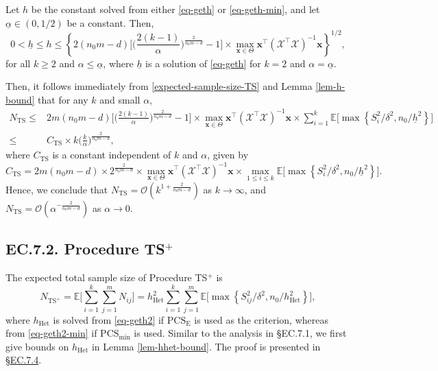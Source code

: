 \documentclass[ijoc,nonblindrev]{informs3}
\def\E{\mathbb{E}}
\def\bx{{\bm x}}
\def\cX{{\mathcal X}}
\def\PCSE{\mathrm{PCS}_{\mathrm{E}}}
\def\hhet{h_{\mathrm{Het}}}
\def\PCSmin{\mathrm{PCS}_{\mathrm{min}}}
\begin{document}
\begin{lemma}  \label{lem-h-bound}
Let $h$ be the constant solved from either \eqref{eq-geth} or \eqref{eq-geth-min}, and let $\underline{\alpha}\in(0, 1/2)$ be a constant.
Then,
$$0 < \underline{h} \leq h \leq \left\{2(n_0m-d)\Big[\Big(\frac{2(k-1)}{\alpha}\Big)^{\frac{2}{n_0m-d}}-1\Big] \times \max_{\bx\in\Theta} \bx^\intercal (\cX^\intercal \cX)^{-1} \bx \right\}^{1/2},$$
for all $k\geq 2$ and $\alpha\leq \underline{\alpha}$,
where $\underline{h}$ is a solution of \eqref{eq-geth} for $k=2$ and $\alpha=\underline{\alpha}$.
\end{lemma}

Then, it follows immediately from \eqref{expected-sample-size-TS} and  Lemma \ref{lem-h-bound} that for any $k$ and small $\alpha$,
\begin{align*}
N_{\text{TS}} \leq{}& 2m(n_0m-d)\Big[\Big(\frac{2(k-1)}{\alpha}\Big)^{\frac{2}{n_0m-d}}-1\Big] \times \max_{\bx\in\Theta} \bx^\intercal (\cX^\intercal \cX)^{-1} \bx \times \sum_{i=1}^k \E \big[\max \left\{ S_i^2/\delta^2, n_0 / \underline{h}^2 \right\}\big]\\
\leq{}& C_{\text{TS}} \times k\Big(\frac{k}{\alpha}\Big)^{\frac{2}{n_0m-d}},
\end{align*}
where $C_{\text{TS}}$ is a constant independent of $k$ and $\alpha$, given by
\[
C_{\text{TS}} = 2m(n_0m-d)\times 2^{\frac{2}{n_0m-d}} \times \max_{\bx\in\Theta} \bx^\intercal (\cX^\intercal \cX)^{-1} \bx \times \max_{1\leq i\leq k} \E \big[\max \left\{ S_i^2/\delta^2, n_0 / \underline{h}^2 \right\}\big].
\]
Hence, we conclude that $N_{\text{TS}} = \mathcal{O}(k^{1+\frac{2}{n_0m-d}})$ as $k\to\infty$, and $N_{\text{TS}} = \mathcal{O}(\alpha^{-\frac{2}{n_0m-d}})$ as $\alpha\to 0$.


\vspace{5pt}
\subsection*{EC.7.2. \hspace{5pt} Procedure TS$^+$}
The expected total sample size of Procedure TS$^+$ is
\begin{equation}\label{expected-sample-size-TS+}
    N_{\text{TS}^+} = \E \bigg[\sum_{i=1}^k \sum_{j=1}^m N_{ij} \bigg] = \hhet^2 \sum_{i=1}^k \sum_{j=1}^m \E \big[ \max \left\{ S_{ij}^2/\delta^2, n_0/\hhet^2 \right\} \big],
\end{equation}
where $\hhet$ is solved from \eqref{eq-geth2} if $\PCSE$ is used as the criterion, whereas from \eqref{eq-geth2-min} if $\PCSmin$ is used.
Similar to the analysis in \S EC.7.1, we first give bounds on $\hhet$ in Lemma \ref{lem-hhet-bound}. The proof is presented in \S\hyperlink{EC.7.4}{EC.7.4}.
\end{document}
